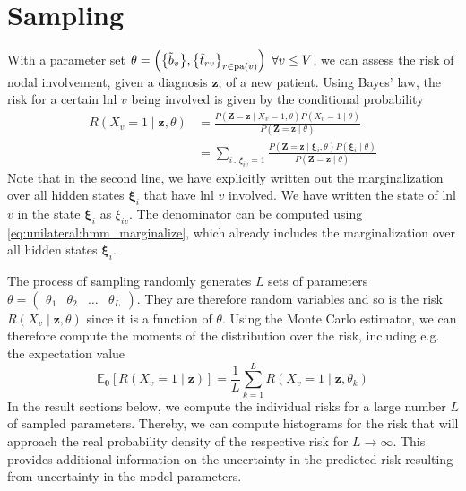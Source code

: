 \documentclass[\relativeRoot/main.tex]{subfiles}
\begin{document}
\section{Sampling}
\label{sec:unilateral:sampling}

With a parameter set $\theta = \left( \big\{ \Tilde{b}_v \big\}, \big\{ \Tilde{t}_{rv} \big\}_{r \in \operatorname{pa}(v)} \right) \ \forall v \leq V$, we can assess the risk of nodal involvement, given a diagnosis $\mathbf{z}$, of a new patient. Using Bayes' law, the risk for a certain \gls{lnl} $v$ being involved is given by the conditional probability
%
\begin{equation} \label{eq:unilateral:sampling:risk}
    \begin{aligned}
        R \left( X_v=1 \mid \mathbf{z}, \theta \right) 
        &= \frac{P \left( \mathbf{Z}=\mathbf{z} \mid X_v=1, \theta \right) P \left( X_v=1 \mid \theta \right)}{P \left( \mathbf{Z}=\mathbf{z} \mid \theta \right)} \\
        &= \sum_{i\,:\,\xi_{iv}=1}{\frac{P \left( \mathbf{Z}=\mathbf{z} \mid \boldsymbol{\xi}_i , \theta \right) P \left( \boldsymbol{\xi}_i \mid \theta \right)}{P \left( \mathbf{Z}=\mathbf{z} \mid \theta \right)}}
    \end{aligned}
\end{equation}
%
Note that in the second line, we have explicitly written out the marginalization over all hidden states $\boldsymbol{\xi}_i$ that have \gls{lnl} $v$ involved. We have written the state of \gls{lnl} $v$ in the state $\boldsymbol{\xi}_i$ as $\xi_{iv}$. The denominator can be computed using \cref{eq:unilateral:hmm_marginalize}, which already includes the marginalization over all hidden states $\boldsymbol{\xi}_i$.

The process of sampling randomly generates $L$ sets of parameters $\theta = \begin{pmatrix} \theta_1 & \theta_2 & \ldots & \theta_L \end{pmatrix}$. They are therefore random variables and so is the risk $R \left( X_v \mid \mathbf{z}, \theta \right)$ since it is a function of $\theta$. Using the Monte Carlo estimator, we can therefore compute the moments of the distribution over the risk, including e.g. the expectation value
%
\begin{equation}
    \mathbb{E}_{\boldsymbol{\theta}} \left[ R \left( X_v = 1 \mid \mathbf{z} \right) \right] = \frac{1}{L} \sum_{k=1}^{L}{R \left( X_v = 1 \mid \mathbf{z}, \theta_k \right)}
\end{equation}
%
In the result sections below, we compute the individual risks for a large number $L$ of sampled parameters. Thereby, we can compute histograms for the risk that will approach the real probability density of the respective risk for $L \rightarrow \infty$. This provides additional information on the uncertainty in the predicted risk resulting from uncertainty in the model parameters.
\end{document}
